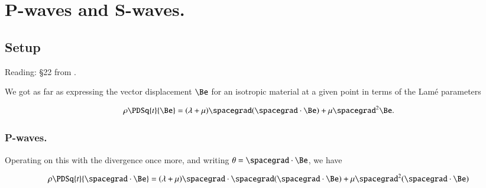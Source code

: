 %
%

\chapter{P-waves and S-waves.}
\label{chap:continuumL7}
{}
\date{Feb 1, 2012}

\beginArtWithToc

%

\section{Setup}

Reading: \S 22 from \cite{landau1960theory}.

We got as far as expressing the vector displacement $\Be$ for an isotropic material at a given point in terms of the Lam\'e parameters

\begin{equation}\label{eqn:continuumL7:10}
\rho \PDSq{t}{\Be} = (\lambda + \mu) \spacegrad (\spacegrad \cdot \Be) + \mu \spacegrad^2 \Be.
\end{equation}

\subsection{P-waves.}

Operating on this with the divergence once more, and writing $\theta = \spacegrad \cdot \Be$, we have

\begin{equation}\label{eqn:continuumL7:30}
\rho \PDSq{t}{\spacegrad \cdot \Be} = (\lambda + \mu) \spacegrad \cdot \spacegrad (\spacegrad \cdot \Be) + \mu \spacegrad^2 (\spacegrad \cdot \Be)
\end{equation}

